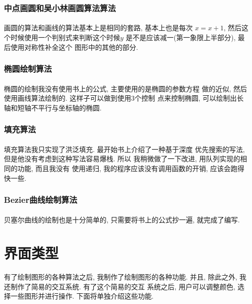 \documentclass{article}
\begin{document}
		\subsubsection{中点画圆和吴小林画圆算法算法}
			\paragraph{}
				画圆的算法和画线的算法基本上是相同的套路, 基本上也是每次
				$x = x + 1$, 然后这个时候使用一个判别式来判断这个时候$y$
				是不是应该减一(第一象限上半部分), 最后使用对称性补全这个
				图形中的其他的部分.
		\subsubsection{椭圆绘制算法}
			\paragraph{}
				椭圆的绘制我没有使用书上的公式, 主要使用的是椭圆的参数方程
				做的近似, 然后使用画线算法绘制的. 这样子可以做到使用3个控制
				点来控制椭圆, 可以绘制出长轴和短轴不平行与坐标轴的椭圆.
		\subsubsection{填充算法}
			\paragraph{}
				填充算法我只实现了洪泛填充. 最开始书上介绍了一种基于深度
				优先搜索的写法, 但是他没有考虑到这种写法容易爆栈. 所以
				我稍微做了一下改进, 用队列实现的相同的功能, 而且我没有
				使用递归, 我的程序应该没有调用函数的开销, 应该会跑得快一些.
		\subsubsection{Bezier曲线绘制算法}
			\paragraph{}
				贝塞尔曲线的绘制也是十分简单的, 只需要将书上的公式抄一遍,
				就完成了编写.
	\section{界面类型}
		\paragraph{}
			有了绘制图形的各种算法之后, 我制作了绘制图形的各种功能. 
			并且, 除此之外, 我还制作了简易的交互系统. 有了这个简易的交互
			系统之后, 用户可以调整颜色, 选择一些图形并进行操作. 
			下面将单独介绍这些功能.
\end{document}
